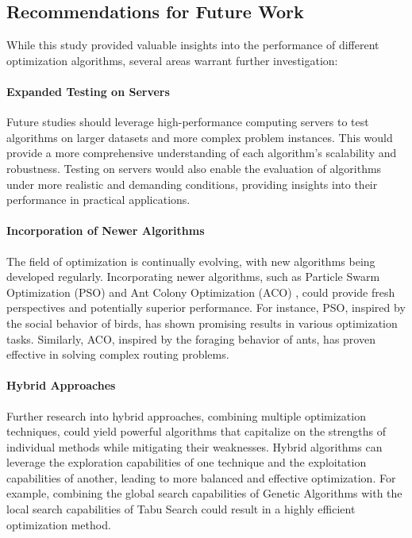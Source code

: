\documentclass{article}
\begin{document}
    \subsection{Recommendations for Future Work}
    While this study provided valuable insights into the performance of different optimization algorithms, several areas warrant further investigation:

    \paragraph{Expanded Testing on Servers}
    Future studies should leverage high-performance computing servers to test algorithms on larger datasets and more complex problem instances. This would provide a more comprehensive understanding of each algorithm's scalability and robustness. Testing on servers would also enable the evaluation of algorithms under more realistic and demanding conditions, providing insights into their performance in practical applications.

    \paragraph{Incorporation of Newer Algorithms}
    The field of optimization is continually evolving, with new algorithms being developed regularly. Incorporating newer algorithms, such as Particle Swarm Optimization (PSO) \cite{Kennedy1995} and Ant Colony Optimization (ACO) \cite{Dorigo2006}, could provide fresh perspectives and potentially superior performance. For instance, PSO, inspired by the social behavior of birds, has shown promising results in various optimization tasks. Similarly, ACO, inspired by the foraging behavior of ants, has proven effective in solving complex routing problems.

    \paragraph{Hybrid Approaches}
    Further research into hybrid approaches, combining multiple optimization techniques, could yield powerful algorithms that capitalize on the strengths of individual methods while mitigating their weaknesses. Hybrid algorithms can leverage the exploration capabilities of one technique and the exploitation capabilities of another, leading to more balanced and effective optimization. For example, combining the global search capabilities of Genetic Algorithms with the local search capabilities of Tabu Search could result in a highly efficient optimization method. \cite[p. 94--96]{toth2014vehicle}
\end{document}
